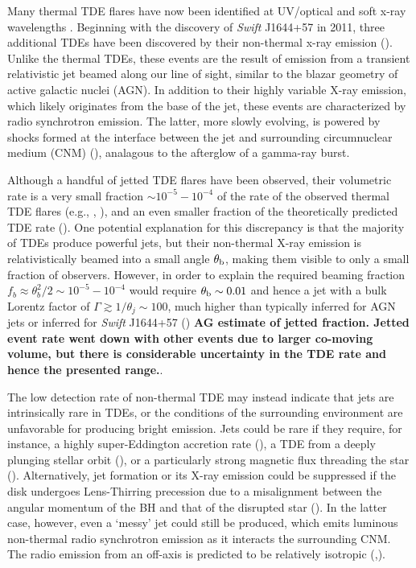 \documentclass[usenatbib,fleqn]{mnras}
\begin{document}
Many thermal TDE flares have now been identified at UV/optical
\citep{van-Velzen+2011, Gezari+2012, Chornock+2014, Arcavi+2014} and
soft x-ray wavelengths \citep{Esquej+2007}.  Beginning with the
discovery of {\it Swift} J1644+57 in 2011, three additional TDEs have
been discovered by their non-thermal x-ray emission
(\citealt{Bloom+2011, Levan+2011, Burrows+2011, Zauderer+2011,
  Cenko+2012, Pasham+2015, Brown+2015}).  Unlike the thermal TDEs,
these events are the result of emission from a transient relativistic
jet beamed along our line of sight, similar to the blazar geometry of
active galactic nuclei (AGN).  In addition to their highly variable
X-ray emission, which likely originates from the base of the jet,
these events are characterized by radio synchrotron emission.  The
latter, more slowly evolving, is powered by shocks formed at the
interface between the jet and surrounding circumnuclear medium (CNM)
(\citealt{Giannios&Metzger2011,Metzger+2012}), analagous to the
afterglow of a gamma-ray burst.

Although a handful of jetted TDE flares have been observed, their
volumetric rate is a very small fraction $\sim 10^{-5}-10^{-4}$ of the
rate of the observed thermal TDE flares (e.g., \citealt{Burrows+2011},
\citealt{Brown+2015}), and an even smaller fraction of the
theoretically predicted TDE rate (\citealt{Stone&Metzger2016}).  One
potential explanation for this discrepancy is that the majority of
TDEs produce powerful jets, but their non-thermal X-ray emission is
relativistically beamed into a small angle $\theta_{\rm b}$, making
them visible to only a small fraction of observers.  However, in order
to explain the required beaming fraction $f_b \approx \theta_{b}^{2}/2
\sim 10^{-5}-10^{-4}$ would require $\theta_{\rm b} \sim 0.01$ and
hence a jet with a bulk Lorentz factor of $\Gamma \gtrsim 1/\theta_j
\sim 100$, much higher than typically inferred for AGN jets or
inferred for {\it Swift} J1644+57 (\citealt{Metzger+2012}) {\bf AG
  estimate of jetted fraction. Jetted event rate went down with other
  events due to larger co-moving volume, but there is considerable
  uncertainty in the TDE rate and hence the presented range.}.

The low detection rate of non-thermal TDE may instead indicate that
jets are intrinsically rare in TDEs, or the conditions of the
surrounding environment are unfavorable for producing bright emission.
Jets could be rare if they require, for instance, a highly
super-Eddington accretion rate (\citealt{De-Colle+2012}), a TDE from a
deeply plunging stellar orbit (\citealt{Metzger&Stone2015}), or a
particularly strong magnetic flux threading the star
(\citealt{Tchekhovskoy+2014,Kelley+2014}).  Alternatively, jet formation
or its X-ray emission could be suppressed if the disk undergoes
Lens-Thirring precession due to a misalignment between the angular
momentum of the BH and that of the disrupted star
(\citealt{Stone&Loeb2012}).  In the latter case, however, even a `messy'
jet could still be produced, which emits luminous non-thermal radio
synchrotron emission as it interacts the surrounding CNM.  The radio
emission from an off-axis is predicted to be relatively isotropic
(\citealt{Giannios&Metzger2011},\citealt{Mimica+2015}).
\end{document}
